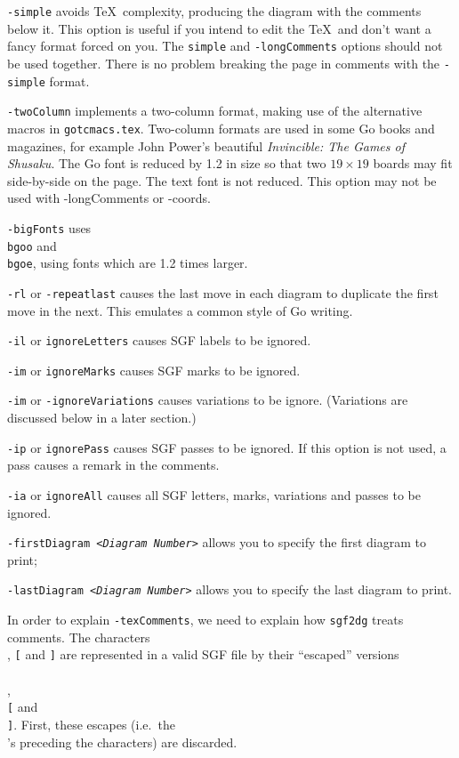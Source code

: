 {\tt -simple} avoids \TeX\ complexity, producing the diagram with
the comments below it. This option is useful if you intend to edit
the \TeX\ and don't want a fancy format forced on you. The {\tt simple}
and {\tt -longComments} options should not be used together. There is
no problem breaking the page in comments with the {\tt -simple} format.

{\tt -twoColumn} implements a two-column format, making use of the alternative
macros in {\tt gotcmacs.tex}. Two-column formats are used in some Go books and
magazines, for example John Power's beautiful {\it Invincible: The Games of
Shusaku}. The Go font is reduced by 1.2 in size so that two $19\times 19$
boards may fit side-by-side on the page. The text font is not reduced. This
option may not be used with -longComments or -coords.

{\tt -bigFonts} uses {\tt \\bgoo} and {\tt \\bgoe}, using fonts which
are 1.2 times larger.

{\tt -rl} or {\tt -repeatlast} causes the last move in each diagram
to duplicate the first move in the next. This emulates a common style
of Go writing.

{\tt -il} or {\tt ignoreLetters} causes SGF labels to be ignored.

{\tt -im} or {\tt ignoreMarks} causes SGF marks to be ignored.

{\tt -im} or {\tt -ignoreVariations} causes variations to be ignore.
(Variations are discussed below in a later section.)

{\tt -ip} or {\tt ignorePass} causes SGF passes to be ignored.
If this option is not used, a pass causes a remark in the comments.

{\tt -ia} or {\tt ignoreAll} causes all SGF letters, marks, variations
and passes to be ignored.

{\tt -firstDiagram <{\it Diagram Number}>} allows you to specify
the first diagram to print;

{\tt -lastDiagram <{\it Diagram Number}>} allows you to specify
the last diagram to print.

In order to explain {\tt -texComments}, we need to explain how
{\tt sgf2dg} treats comments. The characters {\tt \\},
{\tt [} and {\tt ]} are represented in a valid SGF file by their
``escaped'' versions {\tt \\\\}, {\tt \\[} and {\tt \\]}. First,
these escapes (i.e.\ the {\tt \\}'s preceding the characters) are discarded.

